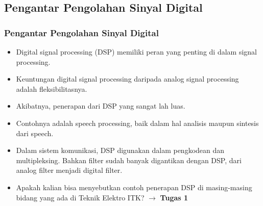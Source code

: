 \documentclass[pdflatex,compress]{beamer}
\begin{document}
\subsection{Pengantar Pengolahan Sinyal Digital}

\begin{frame}
	\frametitle{Pengantar Pengolahan Sinyal Digital}
	\begin{itemize}
		\item Digital signal processing (DSP) memiliki peran yang penting di dalam signal processing.
		\item Keuntungan digital signal processing daripada analog signal processing adalah fleksibilitasnya.
		\item Akibatnya, penerapan dari DSP yang sangat lah luas.
		\item Contohnya adalah speech processing, baik dalam hal analisis maupun sintesis dari speech.
		\item Dalam sistem komunikasi, DSP digunakan dalam pengkodean dan multipleksing. Bahkan filter sudah banyak digantikan dengan DSP, dari analog filter menjadi digital filter.
		\item Apakah kalian bisa menyebutkan contoh penerapan DSP di masing-masing bidang yang ada di Teknik Elektro ITK? $\rightarrow$ \textbf{Tugas 1}
	\end{itemize}
\end{frame}
\end{document}

